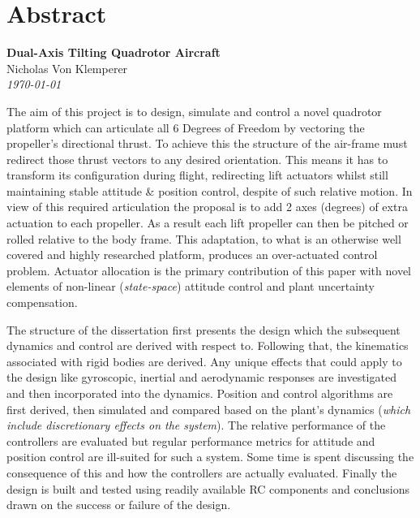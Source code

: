 \documentclass[a4paper, 11pt, oneside, openright, parskip=full]{book}
\newcommand{\auth}{Nicholas Von Klemperer}								%
\newcommand{\titl}{Dual-Axis Tilting Quadrotor Aircraft}						%
\begin{document}
\chapter{Abstract}				
\label{ch:abs}
\begin{center}
	\textbf{\Large \titl}\\
			\vskip 0.2cm
			\auth\\
			\vskip 0.2cm
	\textit{\footnotesize\today}
			\vskip 1cm
\end{center}
The aim of this project is to design, simulate and control a novel quadrotor platform which can articulate all 6 Degrees of Freedom by vectoring the propeller's directional thrust. To achieve this the structure of the air-frame must redirect those thrust vectors to any desired orientation. This means it has to transform its configuration during flight, redirecting lift actuators whilst still maintaining stable attitude \& position control, despite of such relative motion. In view of this required articulation the proposal is to add 2 axes (degrees) of extra actuation to each propeller. As a result each lift propeller can then be pitched or rolled relative to the body frame. This adaptation, to what is an otherwise well covered and highly researched platform, produces an over-actuated control problem. Actuator allocation is the primary contribution of this paper with novel elements of non-linear (\emph{state-space}) attitude control and plant uncertainty compensation.
\par
The structure of the dissertation first presents the design which the subsequent dynamics and control are derived with respect to. Following that, the kinematics associated with rigid bodies are derived. Any unique effects that could apply to the design like gyroscopic, inertial and aerodynamic responses are investigated and then incorporated into the dynamics. Position and control algorithms are first derived, then simulated and compared based on the plant's dynamics (\emph{which include discretionary effects on the system}). The relative performance of the controllers are evaluated but regular performance metrics for attitude and position control are ill-suited for such a system. Some time is spent discussing the consequence of this and how the controllers are actually evaluated. Finally the design is built and tested using readily available RC components and conclusions drawn on the success or failure of the design.
\end{document}
